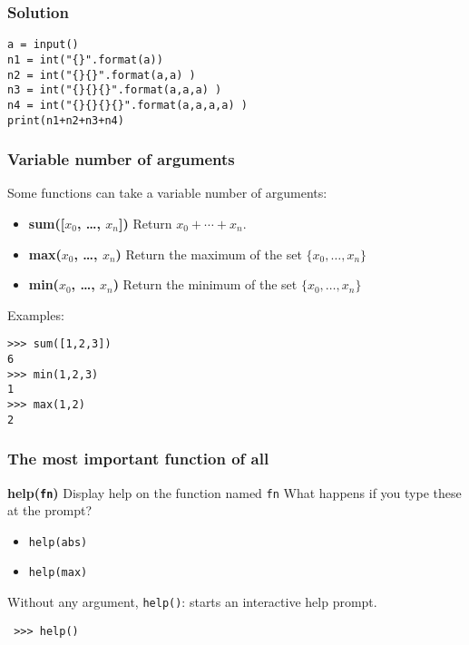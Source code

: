 \begin{frame}[fragile]\frametitle{Solution}
  \begin{lstlisting}
a = input()
n1 = int("{}".format(a))
n2 = int("{}{}".format(a,a) )
n3 = int("{}{}{}".format(a,a,a) )
n4 = int("{}{}{}{}".format(a,a,a,a) )
print(n1+n2+n3+n4)
  \end{lstlisting}
\end{frame}



\begin{frame}[fragile]\frametitle{Variable number of arguments}
  Some functions can take a variable number of arguments:
  \begin{itemize}
    \item {\bf sum([$x_0$, \ldots, $x_n$])} Return $x_0 + \cdots + x_n$.
    \item{\bf max($x_0$, \ldots, $x_n$)} Return the maximum of the set $\{ x_0, \ldots, x_n \}$
    \item {\bf min($x_0$, \ldots, $x_n$)} Return the minimum of the set $\{ x_0, \ldots, x_n \}$
  \end{itemize}

  
  Examples:
\begin{lstlisting}
>>> sum([1,2,3])
6
>>> min(1,2,3)
1
>>> max(1,2)
2
\end{lstlisting}

\end{frame}

\begin{frame}[fragile]\frametitle{The most important function of all}
{\bf help(\texttt{fn})} Display help on the function named \texttt{fn}
What happens if you type these at the prompt?
    \begin{itemize}
    \item \texttt{help(abs)}
    \item \texttt{help(max)}
    \end{itemize}
Without any argument, \texttt{help()}: starts an interactive help prompt.
\begin{lstlisting}
 >>> help()
\end{lstlisting}
\end{frame}



